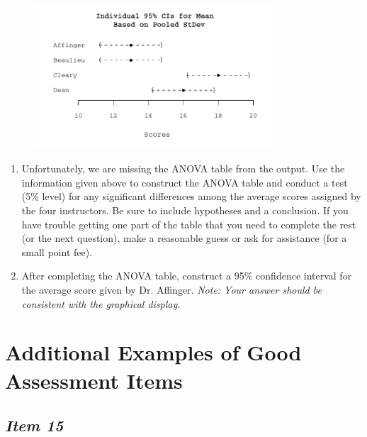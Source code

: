 \begin{figure}




\includegraphics[width=3.5in]{includes/Item7_R.pdf}


\end{figure}





\renewcommand{\labelenumi}{\arabic{enumi}.}


\begin{enumerate}[leftmargin=1cm, itemsep=.2em]


\item Unfortunately, we are missing the ANOVA table from the output. Use the information given above to construct the ANOVA table and conduct a test (5\% level) for any significant differences among the average scores assigned by the four instructors. Be sure to include hypotheses and a conclusion. If you have trouble getting one part of the table that you need to complete the rest (or the next question), make a reasonable guess or ask for assistance (for a small point fee). 


\item After completing the ANOVA table, construct a 95\% confidence interval for the average score given by Dr. Affinger. \textit{Note: Your answer should be consistent with the graphical display.}


\end{enumerate}








\section{\textbf{Additional Examples of Good Assessment Items}}





\subsection{\textbf{\textit{Item 15}}}


